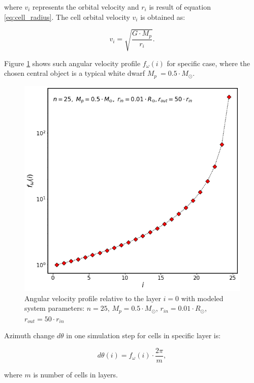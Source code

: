 where $v_i$ represents the orbital velocity and $r_i$ is result of equation \ref{eq:cell_radius}. The cell orbital velocity $v_i$ is obtained as:

\begin{equation}
v_i = \sqrt{\frac{G \cdot M_p}{r_i}}.
\end{equation}

Figure \ref{fig:profile_omega} shows such angular velocity profile $f_{\omega}(i)$ for specific case, where the chosen central object is a typical white dwarf $M_p\ = 0.5 \cdot M_{\odot}$.

\begin{figure}[h]
\centering
\includegraphics[width=1.0\columnwidth]{img/profile_omega.png}
\caption{Angular velocity profile relative to the layer $i = 0$ with modeled system parameters: $n=25$, $M_p = 0.5 \cdot M_{\odot}$, $r_{in} = 0.01 \cdot R_{\odot}$, $r_{out} = 50 \cdot r_{in}$}
\label{fig:profile_omega}
\end{figure}

Azimuth change $d\theta$ in one simulation step for cells in specific layer is:

\begin{equation}
d\theta(i) = f_{\omega}(i) \cdot \frac{2\pi}{m},
\end{equation}

where $m$ is number of cells in layers. 

